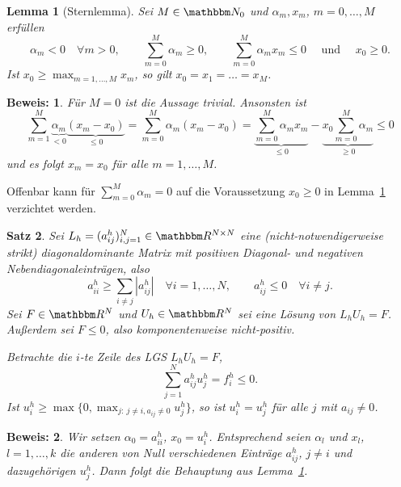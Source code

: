 \documentclass[12pt,a4paper]{book}
\theoremstyle{break}
\newtheorem{theorem}{Satz}[chapter]
\newtheorem{lemma}[theorem]{Lemma}
\theoremstyle{nonumberplain}
\newtheorem{beweis}{Beweis:}
\newcommand{\N}{\mathbbm N}
\newcommand{\R}{\mathbbm R}
\newcommand{\1}{\mathbbm{1}} 			      	%
\begin{document}
\begin{lemma}[Sternlemma]\label{lemma:stern}
Sei $M\in \N_0$ und $\alpha_m,x_m$, $m=0,\ldots,M$ erfüllen
\[
\alpha_m<0 \quad \forall m>0,\qquad \sum_{m=0}^M \alpha_m\geq 0, \qquad
\sum_{m=0}^M \alpha_m x_m\leq 0 \quad \mbox{ und } \quad x_0\geq 0.
\]
Ist $x_0\geq \max_{m=1,\ldots,M} x_m$, so gilt $x_0=x_1=\ldots=x_M$.
\end{lemma}
\begin{beweis}
Für $M=0$ ist die Aussage trivial. Ansonsten ist
\[
\sum_{m=1}^M \underbrace{\alpha_m}_{< 0} \underbrace{(x_m - x_0)}_{\leq 0}=\sum_{m=0}^M \alpha_m (x_m - x_0)=\underbrace{\sum_{m=0}^M \alpha_m x_m}_{\leq 0} - \underbrace{x_0\sum_{m=0}^M\alpha_m}_{\geq 0}\leq 0
\]
und es folgt $x_m=x_0$ für alle $m=1,\ldots,M$.
\end{beweis}
Offenbar kann für $\sum_{m=0}^M\alpha_m=0$ auf die Voraussetzung $x_0\geq 0$ in Lemma~\ref{lemma:stern} verzichtet werden.

\begin{theorem}\label{thm:diskretes_maxprinzip}
Sei $L_h=(a^h_{ij})_{i,j=1}^N\in \R^{N\times N}$ eine (nicht-notwendigerweise strikt) diagonaldominante Matrix mit positiven Diagonal- und negativen 
Nebendiagonaleinträgen, also
\[
a^h_{ii}\geq \sum_{i\neq j} |a^h_{ij}|  \quad \forall i=1,\ldots,N, \qquad a^h_{ij}\leq 0 \quad \forall i\neq j.
\]
Sei $F\in \R^{N}$ und $U_h\in \R^N$ sei eine Lösung von $L_h U_h=F$. 
Außerdem sei $F\leq 0$, also komponentenweise nicht-positiv. 

Betrachte die $i$-te Zeile des LGS $L_h U_h =F$,
\[
\sum_{j=1}^N a^h_{ij} u^{h}_j =f^h_i\leq 0.
\]
Ist $u^h_i\geq \max\{0,\max_{j:\ j\neq i, a_{ij}\neq 0} u^h_j\}$, so 
ist $u^h_i=u^h_j$ für alle $j$ mit $a_{ij}\neq 0$.
\end{theorem}
\begin{beweis}
Wir setzen $\alpha_0=a^h_{ii}$, $x_0=u^h_i$. Entsprechend seien $\alpha_l$ und $x_l$, $l=1,\ldots,k$ die anderen
von Null verschiedenen Einträge $a^h_{ij}$, $j\neq i$ und dazugehörigen $u^h_j$. Dann folgt die Behauptung aus
Lemma~\ref{lemma:stern}.
\end{beweis}
\end{document}
